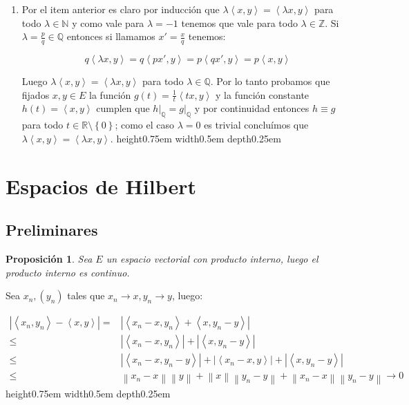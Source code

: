 \documentclass[11pt]{article}
\newcommand{\Q}{\mathbb{Q}}
\newcommand{\Z}{\mathbb{Z}}
\newcommand{\R}{{\mathbb{R}}}
\newcommand{\N}{{\mathbb{N}}}
\newcommand{\norm}[1]{\left\lVert#1\right\rVert}
\newcommand{\abs}[1]{\left\lvert#1\right\rvert}
\newcommand{\ip}[1]{\left\langle#1\right\rangle}
\newcommand{\sett}[1]{\left\lbrace#1\right\rbrace}
\numberwithin{theorem}{subsection}
\newtheorem{proposition}[theorem]{Proposici\'on}
\newenvironment{proof}[1][Demostraci\'on]{\begin{trivlist}
		\item[\hskip \labelsep {\bfseries #1}]}{\end{trivlist}}
\newcommand{\qed}{\nobreak \ifvmode \relax \else
	\ifdim\lastskip<1.5em \hskip-\lastskip
	\hskip1.5em plus0em minus0.5em \fi \nobreak
	\vrule height0.75em width0.5em depth0.25em\fi}
\begin{document}
\begin{proof}
\begin{enumerate}
		\item Por el item anterior es claro por inducci\'on que $\lambda \ip{x,y} = \ip{\lambda x,y}$ para todo $\lambda \in \N$ y como vale para $\lambda = -1$ tenemos que vale para todo $\lambda \in \Z$. Si $\lambda = \frac{p}{q} \in \Q$ entonces si llamamos $x' = \frac{x}{q}$ tenemos:
		
		\[
			q\ip{\lambda x, y} = q \ip{p x',y} = p \ip{qx',y} = p \ip{x,y}
		\]
		
		Luego $\lambda \ip{x,y} = \ip{\lambda x, y}$ para todo $\lambda \in \Q$. Por lo tanto probamos que fijados $x,y \in E$ la funci\'on $g(t)=\frac{1}{t} \ip{tx,y}$ y la funci\'on constante $h(t) = \ip{x,y}$ cumplen que $h\vert_{\Q} = g \vert_{\Q}$ y por continuidad entonces $h \equiv g$ para todo $t \in \R \setminus \sett{0}$; como el caso $\lambda = 0$ es trivial conclu\'imos que $\lambda \ip{x,y} = \ip{\lambda x,y}$. \qed
		
	\end{enumerate}
	
\end{proof}

\section{Espacios de Hilbert}

\subsection{Preliminares}

\begin{proposition}
	\label{Prod interno es continuo}
	Sea $E$ un espacio vectorial con producto interno, luego el producto interno es continuo.
\end{proposition}

\begin{proof}
	Sea $x_n, (y_n)$ tales que $x_n \rightarrow x, y_n \rightarrow y$, luego:
	
	\begin{equation*}
	\begin{aligned}
		\abs{\ip{x_n,y_n} -  \ip{x,y}} = & \abs{\ip{x_n - x,y_n} + \ip{x,y_n - y}} \\ 
		\leq & \abs{\ip{x_n-x,y_n}} + \abs{\ip{x,y_n-y}} \\
		\leq & \abs{\ip{x_n-x,y_n -y}} + \abs{\ip{x_n-x,y}} + \abs{\ip{x,y_n-y}} \\ 
		\leq & \norm{x_n - x}\norm{y} + \norm{x}\norm{y_n-y} + \norm{x_n - x}\norm{y_n-y} \rightarrow 0 
	\end{aligned}
	\end{equation*}
	\qed
\end{proof}
\end{document}
